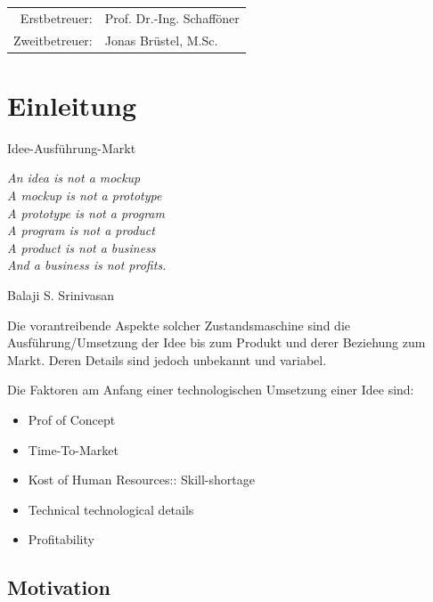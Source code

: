 \documentclass[
12pt,
english,
ngerman,
headsepline,
twoside,
openright,
numbers=noenddot,version=first
]{scrreprt}
\providecommand{\tabularnewline}{\\}
\let\myTOC\tableofcontents
\renewcommand\tableofcontents{
\begin{spacing}{1.1}
\myTOC
\end{spacing}
\clearpage
\pagenumbering{arabic}
}
\begin{document}
\vspace{1cm}

\noindent \begin{center}
\medskip{}
\begin{tabular}{rl}
Erstbetreuer: & Prof. Dr.-Ing. Schafföner\tabularnewline
Zweitbetreuer: & Jonas Brüstel, M.Sc.\tabularnewline
\end{tabular}
\par\end{center}

\noindent \begin{center}
{\huge }
\par\end{center}{\huge \par}

\newpage{}

%
\tableofcontents{}

\pagestyle{scrheadings}


\chapter{Einleitung}{Idee-Ausführung-Markt}
\setcounter{page}{1}
\label{chap:introduction}
\epigraph{\textit{\textquotedbl{}
An idea is not a mockup\\
A mockup is not a prototype\\
A prototype is not a program\\
A program is not a product\\
A product is not a business\\
And a business is not profits.\textquotedbl{}}}{
Balaji S. Srinivasan }

Die vorantreibende Aspekte solcher Zustandsmaschine sind die Ausführung/Umsetzung der Idee bis zum Produkt und derer Beziehung zum Markt. Deren Details sind jedoch unbekannt und variabel.

Die Faktoren am Anfang einer technologischen Umsetzung einer Idee sind:
\begin{itemize}
\item Prof of Concept
\item Time-To-Market
\item Kost of Human Resources:: Skill-shortage
\item Technical technological details
\item Profitability
\end{itemize}


\section{Motivation}
\end{document}
